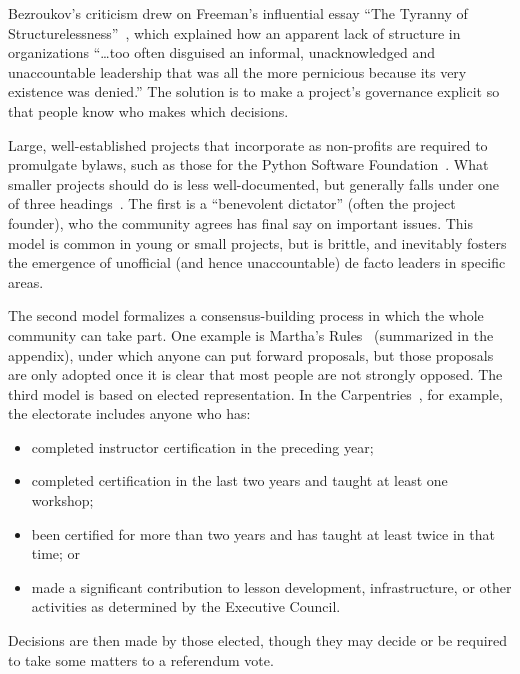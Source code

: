 \documentclass[10pt,letterpaper]{article}
\begin{document}
Bezroukov's criticism drew on Freeman's influential essay ``The Tyranny of Structurelessness''~\cite{freeman1972},
which explained how an apparent lack of structure in organizations ``{\ldots}too often disguised an informal,
unacknowledged and unaccountable leadership that was all the more pernicious because its very existence was denied.''
The solution is to make a project's governance explicit
so that people know who makes which decisions.

Large, well-established projects that incorporate as non-profits are required to promulgate bylaws,
such as those for the Python Software Foundation~\cite{psf-bylaws}.
What smaller projects should do is less well-documented,
but generally falls under one of three headings~\cite{fogel2005}.
The first is a ``benevolent dictator'' (often the project founder),
who the community agrees has final say on important issues.
This model is common in young or small projects,
but is brittle,
and inevitably fosters the emergence of unofficial (and hence unaccountable) de facto leaders
in specific areas.

The second model formalizes a consensus-building process
in which the whole community can take part.
One example is Martha's Rules~\cite{minahan1986} (summarized in the appendix),
under which anyone can put forward proposals,
but those proposals are only adopted once it is clear that most people are not strongly opposed.
The third model is based on elected representation.
In the Carpentries~\cite{carpentries-bylaws},
for example,
the electorate includes anyone who has:

\begin{itemize}

\item
  completed instructor certification in the preceding year;

\item
  completed certification in the last two years and taught at least one workshop;

\item
  been certified for more than two years and has taught at least twice in that time;
  or

\item
  made a significant contribution to lesson development, infrastructure, or other activities
  as determined by the Executive Council.

\end{itemize}

\noindent
Decisions are then made by those elected,
though they may decide or be required to take some matters to a referendum vote.
\end{document}
